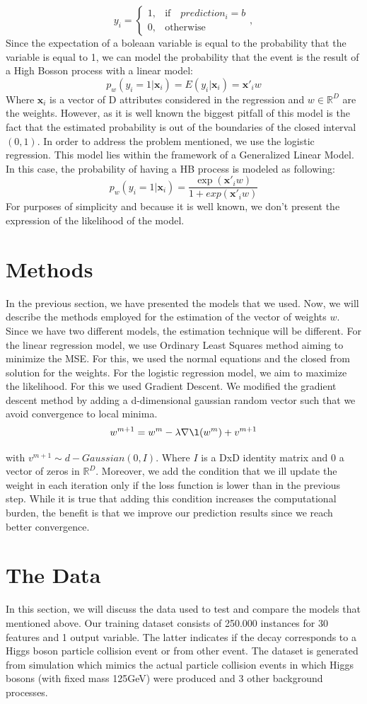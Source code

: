 \documentclass[10pt,conference,compsocconf]{IEEEtran}
\newcommand{\R}{\mathbb{R}}
\begin{document}
 $$
y_{i}=
\begin{cases}
1, & \text{if} \quad prediction_i=b\\
0, & \text{otherwise}
\end{cases}
, 
$$
Since the expectation of a boleaan variable is equal to the probability that the variable is equal to 1, we can model the probability that the event is the result of a High Bosson process with a linear model:
$$p_w(y_i=1|\textbf{x}_i)=E(y_i|\textbf{x}_i)=\textbf{x}'_i w$$
Where $\textbf{x}_i $ is a vector of D attributes considered in the regression and $w \in \R^D $ are the weights.
However, as it is well known the biggest pitfall of this model is the fact that the estimated probability is out of the boundaries of the closed interval $ ( 0,1 ) $. 
In order to address the problem mentioned, we use the logistic regression. This model lies within the framework of a Generalized Linear Model.  In this case, the probability of having a HB process is modeled as following:
$$p_w(y_i=1|\textbf{x}_i)=\frac{\exp(\textbf{x}'_i w)}{1+exp(\textbf{x}'_i w)}$$
For purposes of simplicity and because it is well known, we don't present the expression of the likelihood of the model.
\section{Methods}
In the previous section, we have presented the models that we used. Now, we will describe the methods employed for the estimation of the vector of weights $w$. Since we have two different models, the estimation technique will be different. 
For the linear regression model, we use Ordinary Least Squares method aiming to minimize the MSE. For this, we used the normal equations and the closed from solution for the weights. 
For the logistic regression model, we aim to maximize the likelihood. For this we used Gradient Descent. We modified the gradient descent method by adding a d-dimensional gaussian random vector such that we avoid convergence to local minima. 
$$w^{m+1}=w^{m}-\lambda  \nabla \l(w^m) +v^{m+1}$$

with $v^{m+1} \sim d-Gaussian(0,I)$. Where $I$ is a DxD identity matrix and 0 a vector of zeros in $\R^D$.
Moreover, we add the condition that we ill update the weight in each iteration only if the loss function is lower than in the previous step. While it is true that adding this condition increases the computational burden, the benefit is that we improve our prediction results since we reach better convergence.
\section{The Data}
\label{S1}
In this section, we will discuss the data used to test and compare the models that mentioned above. Our training dataset consists of 250.000 instances for 30 features and 1 output variable. The latter indicates if the decay corresponds to a Higgs boson particle collision event or from other event. The dataset is generated from simulation which mimics the actual particle collision events in which Higgs bosons (with fixed mass 125GeV) were produced and 3 other background processes. 
\end{document}
